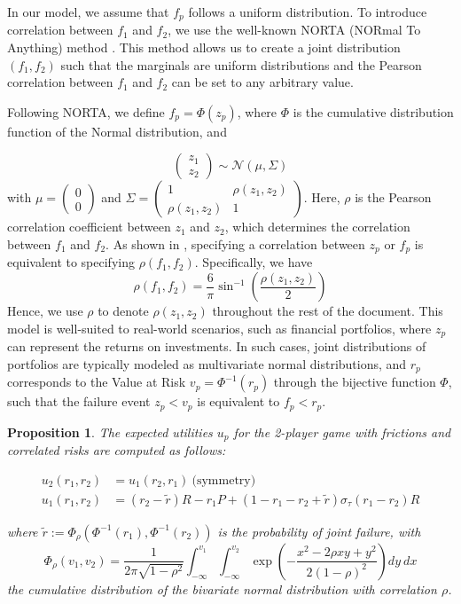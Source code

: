 \documentclass[preprint,12pt,authoryear]{elsarticle}
\newtheorem{proposition}[theorem]{Proposition}
\theoremstyle{definition}
\begin{document}
In our model, we assume that $f_p$ follows a uniform distribution. To introduce correlation between $f_1$ and $f_2$, we use the well-known NORTA (NORmal To Anything) method \citep{norta1997}. This method allows us to create a joint distribution $(f_1, f_2)$ such that the marginals are uniform distributions and the Pearson correlation between $f_1$ and $f_2$ can be set to any arbitrary value.

Following NORTA, we define $f_p = \Phi(z_p)$, where $\Phi$ is the cumulative distribution function of the Normal distribution, and

$$\begin{pmatrix}z_1\\z_2\end{pmatrix} \sim \mathcal{N}\left(\mu, \Sigma\right)$$
with $\mu = \begin{pmatrix}0\\0\end{pmatrix}$ and 
$\Sigma = \begin{pmatrix}
    1 & \rho(z_1, z_2) \\
    \rho(z_1, z_2) & 1
\end{pmatrix}$.
Here, $\rho$ is the Pearson correlation coefficient between $z_1$ and $z_2$, which determines the correlation between $f_1$ and $f_2$.
As shown in \citet{norta1997}, specifying a correlation between $z_p$ or $f_p$ is equivalent to specifying $\rho(f_1, f_2)$. Specifically, we have $$\rho(f_1, f_2) = \frac{6}{\pi}\sin^{-1}\left(\frac{\rho(z_1, z_2)}{2}\right)$$ 
Hence, we use $\rho$ to denote $\rho(z_1, z_2)$ throughout the rest of the document.
This model is well-suited to real-world scenarios, such as financial portfolios, where $z_p$ can represent the returns on investments. In such cases, joint distributions of portfolios are typically modeled as multivariate normal distributions, and $r_p$ corresponds to the Value at Risk $v_p = \Phi^{-1}(r_p)$ through the bijective function $\Phi$, such that the failure event $z_p < v_p$ is equivalent to $f_p < r_p$.

\begin{proposition}
    The expected utilities $u_p$ for the 2-player game with frictions and correlated risks are computed as follows:

    \begin{align}
    \label{eq:utility}
    u_2(r_1, r_2) &= u_1(r_2, r_1) ~\text{(symmetry)}\\
    u_1(r_1, r_2) &= (r_2 - \tilde r) R - r_1 P + (1-r_1-r_2 + \tilde r) \sigma_\tau(r_1 - r_2)R
    \end{align}

    where $\tilde r := \Phi_\rho(\Phi^{-1}(r_1), \Phi^{-1}(r_2))$ is the probability of joint failure, with $$\Phi_\rho(v_1, v_2) = \frac{1}{2\pi\sqrt{1 - \rho^2}} \int_{-\infty}^{v_1}\int_{-\infty}^{v_2} \exp\left(-\frac{x^2 - 2\rho x y + y^2}{2(1-\rho)^2}\right) dy~dx$$ the cumulative distribution of the bivariate normal distribution with correlation $\rho$.
\end{proposition}
\end{document}
